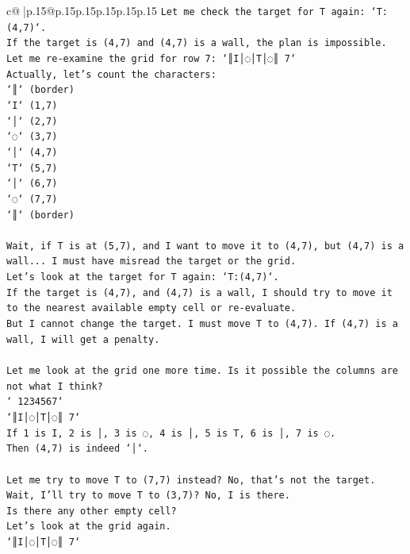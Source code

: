 \documentclass{article}
\begin{document}
{\begin{supertabular}{c@{$\;$}|p{.15\linewidth}@{}p{.15\linewidth}p{.15\linewidth}p{.15\linewidth}p{.15\linewidth}p{.15\linewidth}}
{{{\texttt{Let me check the target for T again: `T:(4,7)`.} \\
\texttt{If the target is (4,7) and (4,7) is a wall, the plan is impossible.} \\
\texttt{Let me re{-}examine the grid for row 7: `║I│◌│T│◌║ 7`} \\
\texttt{Actually, let's count the characters:} \\
\texttt{`║` (border)} \\
\texttt{`I` (1,7)} \\
\texttt{`│` (2,7)} \\
\texttt{`◌` (3,7)} \\
\texttt{`│` (4,7)} \\
\texttt{`T` (5,7)} \\
\texttt{`│` (6,7)} \\
\texttt{`◌` (7,7)} \\
\texttt{`║` (border)} \\
\\ 
\texttt{Wait, if T is at (5,7), and I want to move it to (4,7), but (4,7) is a wall... I must have misread the target or the grid.} \\
\texttt{Let's look at the target for T again: `T:(4,7)`.} \\
\texttt{If the target is (4,7), and (4,7) is a wall, I should try to move it to the nearest available empty cell or re{-}evaluate.} \\
\texttt{But I cannot change the target. I must move T to (4,7). If (4,7) is a wall, I will get a penalty.} \\
\\ 
\texttt{Let me look at the grid one more time. Is it possible the columns are not what I think?} \\
\texttt{` 1234567`} \\
\texttt{`║I│◌│T│◌║ 7`} \\
\texttt{If 1 is I, 2 is │, 3 is ◌, 4 is │, 5 is T, 6 is │, 7 is ◌.} \\
\texttt{Then (4,7) is indeed `│`.} \\
\\ 
\texttt{Let me try to move T to (7,7) instead? No, that's not the target.} \\
\texttt{Wait, I'll try to move T to (3,7)? No, I is there.} \\
\texttt{Is there any other empty cell?} \\
\texttt{Let's look at the grid again.} \\
\texttt{`║I│◌│T│◌║ 7`} \\
}}}
\end{supertabular}}
\end{document}
